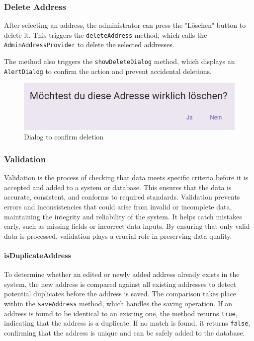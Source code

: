 \subsubsection{Delete Address}
After selecting an address, the administrator can press the "Löschen" button to delete it. This triggers the \texttt{deleteAddress} method, which calls the \texttt{AdminAddressProvider} to delete the selected addresses.\blankLine

The method also triggers the \texttt{showDeleteDialog} method, which displays an \texttt{AlertDialog} to confirm the action and prevent accidental deletions.

\begin{figure}[H]
    \centering
    \includegraphics[width=0.6\linewidth]{images/AdminPanel/DeleteDialog.png}
    \caption{Dialog to confirm deletion}
\end{figure}

\subsubsection{Validation}
\label{fig:Validation}
    Validation is the process of checking that data meets specific criteria before it is accepted and added to a system or database. This ensures that the data is accurate, consistent, and conforms to required standards. Validation prevents errors and inconsistencies that could arise from invalid or incomplete data, maintaining the integrity and reliability of the system. It helps catch mistakes early, such as missing fields or incorrect data inputs. By ensuring that only valid data is processed, validation plays a crucial role in preserving data quality. \autocite{ContributorstoWikimediaprojects2025Feb}

\paragraph*{isDuplicateAddress}
    To determine whether an edited or newly added address already exists in the system, the new address is compared against all existing addresses to detect potential duplicates before the address is saved. The comparison takes place within the \texttt{saveAddress} method, which handles the saving operation. If an address is found to be identical to an existing one, the method returns \texttt{true}, indicating that the address is a duplicate. If no match is found, it returns \texttt{false}, confirming that the address is unique and can be safely added to the database.

